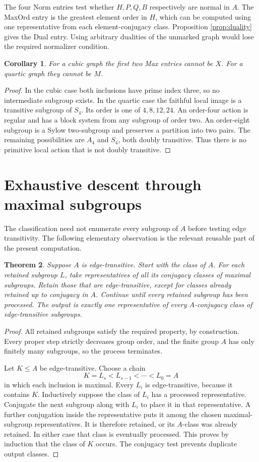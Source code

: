 \documentclass[11pt]{article}
\newtheorem{theorem}{Theorem}
\newtheorem{corollary}[theorem]{Corollary}
\theoremstyle{definition}\newtheorem{definition}[theorem]{Definition}
\begin{document}
The four Norm entries test whether $H,P,Q,B$ respectively are
normal in $A$.  The MaxOrd entry is the greatest element order in
$H$, which can be computed using one representative from each
element-conjugacy class.  Proposition \ref{prop:duality} gives the
Dual entry.  Using arbitrary dualities of the unmarked graph would
lose the required normalizer condition.

\begin{corollary}
For a cubic graph the first two Max entries cannot be $X$.
For a quartic graph they cannot be $M$.
\end{corollary}
\begin{proof}
In the cubic case both inclusions have prime index three, so no
intermediate subgroup exists.  In the quartic case the faithful
local image is a transitive subgroup of $S_4$.  Its order is one of
$4,8,12,24$.  An order-four action is regular and has a block system
from any subgroup of order two.  An order-eight subgroup is a Sylow
two-subgroup and preserves a partition into two pairs.  The remaining
possibilities are $A_4$ and $S_4$, both doubly transitive.  Thus there
is no primitive local action that is not doubly transitive.
\end{proof}

\section{Exhaustive descent through maximal subgroups}
The classification need not enumerate every subgroup of $A$ before
testing edge transitivity.  The following elementary observation is
the relevant reusable part of the present computation.

\begin{theorem}\label{thm:descent}
Suppose $A$ is edge-transitive.  Start with the class of $A$.  For each retained subgroup $L$, take
representatives of all its conjugacy classes of maximal subgroups.
Retain those that are edge-transitive, except for classes already
retained up to conjugacy in $A$.  Continue until every retained
subgroup has been processed.  The output is exactly one representative
of every $A$-conjugacy class of edge-transitive subgroups.
\end{theorem}
\begin{proof}
All retained subgroups satisfy the required property, by construction.
Every proper step strictly decreases group order, and the finite
group $A$ has only finitely many subgroups, so the process terminates.

Let $K\le A$ be edge-transitive.  Choose a chain
\[
             K=L_s<L_{s-1}<\cdots<L_0=A
\]
in which each inclusion is maximal.  Every $L_i$ is edge-transitive,
because it contains $K$.  Inductively suppose the class of $L_i$
has a processed representative.  Conjugate the next subgroup along
with $L_i$ to place it in that representative.  A further conjugation
inside the representative puts it among the chosen maximal-subgroup
representatives.  It is therefore retained, or its $A$-class was
already retained.  In either case that class is eventually processed.
This proves by induction that the class of $K$ occurs.  The conjugacy
test prevents duplicate output classes.
\end{proof}
\end{document}
